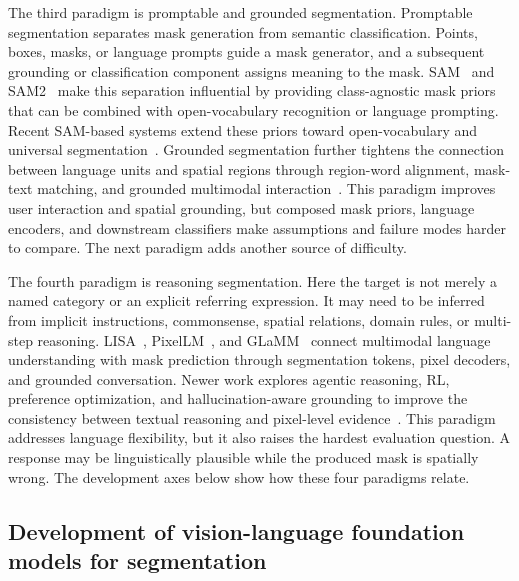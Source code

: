 The third paradigm is promptable and grounded segmentation. Promptable segmentation separates mask generation from semantic classification. Points, boxes, masks, or language prompts guide a mask generator, and a subsequent grounding or classification component assigns meaning to the mask. SAM~\citep{kirillov2023sam} and SAM2~\citep{ravi2024sam2} make this separation influential by providing class-agnostic mask priors that can be combined with open-vocabulary recognition or language prompting. Recent SAM-based systems extend these priors toward open-vocabulary and universal segmentation~\citep{xhanBoostingSegmentAnything2025,hwangXSAMSegmentAnything2026,sgxiaoOpenworldsamExtendingSam22026}. Grounded segmentation further tightens the connection between language units and spatial regions through region-word alignment, mask-text matching, and grounded multimodal interaction~\citep{xuPixelalignedLanguageModel2024,zhangLlavagroundingGroundedVisual2024,youFerretReferGround2024,rasheedGlammPixelGrounding2024}. This paradigm improves user interaction and spatial grounding, but composed mask priors, language encoders, and downstream classifiers make assumptions and failure modes harder to compare. The next paradigm adds another source of difficulty.

The fourth paradigm is reasoning segmentation. Here the target is not merely a named category or an explicit referring expression. It may need to be inferred from implicit instructions, commonsense, spatial relations, domain rules, or multi-step reasoning. LISA~\citep{lai2024lisa}, PixelLM~\citep{renPixellmPixelReasoning2024}, and GLaMM~\citep{rasheed2024glamm} connect multimodal language understanding with mask prediction through segmentation tokens, pixel decoders, and grounded conversation. Newer work explores agentic reasoning, RL, preference optimization, and hallucination-aware grounding to improve the consistency between textual reasoning and pixel-level evidence~\citep{luoConnectingDotsTrainingFree2026,zhuLensLearningSegment2026,zhuPopenPreferencebasedOptimization2025,zhouReasoningImplicitSelfsupervised2026,guoSeeingBelievingRichContext2026}. This paradigm addresses language flexibility, but it also raises the hardest evaluation question. A response may be linguistically plausible while the produced mask is spatially wrong. The development axes below show how these four paradigms relate.

\subsection{Development of vision-language foundation models for segmentation}

